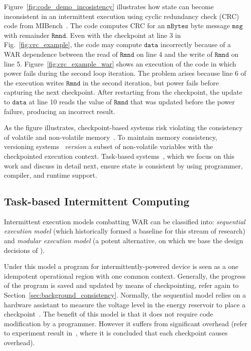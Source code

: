 Figure~\ref{fig:code_demo_incosistency} illustrates how state can become
inconsistent in an intermittent execution using cyclic redundancy check (CRC)
code from MIBench~\cite{hicks_mibench2_2016}. The code computes CRC for an
$\texttt{nBytes}$ byte message $\texttt{msg}$ with remainder $\texttt{Rmnd}$.
Even with the checkpoint at line 3 in Fig.~\ref{fig:crc_example}, the code may
compute  $\texttt{data}$ incorrectly because  of a WAR dependence between the
read of $\texttt{Rmnd}$ on line 4 and the write of $\texttt{Rmnd}$ on line 5.
Figure~\ref{fig:crc_example_war} shows an execution of the code in which power
fails during the second loop iteration.  The problem arises because line 6 of
the execution writes $\texttt{Rmnd}$ in the second iteration, but power fails
before capturing the next checkpoint.  After restarting from the checkpoint,
the update to $\texttt{data}$ at line 10 reads the value of $\texttt{Rmnd}$
that was updated before the power failure, producing an incorrect result.

As the figure illustrates, checkpoint-based systems risk violating the
consistency of volatile and non-volatile memory~\cite{dino}. To maintain memory
consistency, versioning systems~\cite{dino,ratchet} {\em version} a subset of
non-volatile variables with the checkpointed execution context. Task-based
systems~\cite{chain,alpaca}, which we focus on this work and discuss in detail
next, ensure state is consistent by using programmer, compiler, and runtime
support.


\subsection{Task-based Intermittent Computing}
\label{section:background_task_computing}


Intermittent execution models combatting WAR can be classified into: \emph{sequential execution model} (which historically formed a baseline for this stream of research) and \emph{modular execution model} (a potent alternative, on which we base the design decisions of \sys). 

Under this model a program for intermittently-powered device is seen as a one idempotent operational region with one common context. Generally, the progress of the program is saved and updated by means of checkpointing, refer again to Section~\ref{sec:background_consistency}. Normally, the sequential model relies on a hardware assistant to measure the voltage level in the energy reservoir to place a checkpoint~\cite{mementos,mottola2017harvos,hibernus}. The benefit of this model is that it does not require code modification by a programmer. However it suffers from significant overhead (refer to experiment result in~\cite[Fig. 3]{chain}, where it is concluded that each checkpoint causes overhead). 

